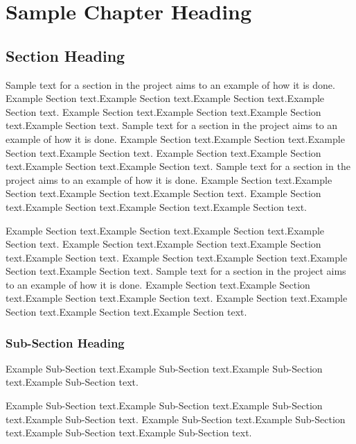 \documentclass[11pt,twosided,a4paper]{report}
\begin{document}
\maketitle
\newpage
\tableofcontents
\newpage
\fi

\chapter{Sample Chapter Heading}	\label{chap-sample}

\section{Section Heading}
Sample text for a section in the \projname project aims to an example of how it is done.
Example Section text.Example Section text.Example Section text.Example Section text.
Example Section text.Example Section text.Example Section text.Example Section text.
Sample text for a section in the \projname project aims to an example of how it is done.
Example Section text.Example Section text.Example Section text.Example Section text.
Example Section text.Example Section text.Example Section text.Example Section text.
Sample text for a section in the \projname project aims to an example of how it is done.
Example Section text.Example Section text.Example Section text.Example Section text.
Example Section text.Example Section text.Example Section text.Example Section text.

Example Section text.Example Section text.Example Section text.Example Section text.
Example Section text.Example Section text.Example Section text.Example Section text.
Example Section text.Example Section text.Example Section text.Example Section text.
Sample text for a section in the \projname project aims to an example of how it is done.
Example Section text.Example Section text.Example Section text.Example Section text.
Example Section text.Example Section text.Example Section text.Example Section text.

\subsection{Sub-Section Heading}

Example Sub-Section text.Example Sub-Section text.Example Sub-Section text.Example Sub-Section text.

Example Sub-Section text.Example Sub-Section text.Example Sub-Section text.Example Sub-Section text.
Example Sub-Section text.Example Sub-Section text.Example Sub-Section text.Example Sub-Section text.
\end{document}
